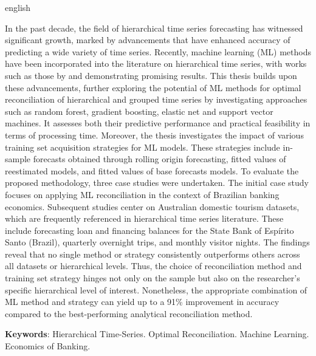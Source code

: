 \begin{resumo}[Abstract]
  \begin{otherlanguage*}{english}
    
    In the past decade, the field of hierarchical time series forecasting has witnessed significant growth, marked by advancements that have enhanced accuracy of predicting a wide variety of time series. Recently, machine learning (ML) methods have been incorporated into the literature on hierarchical time series, with works such as those by \textcite{spiliotis_hierarchical_2021} and \textcite{makridakis_m5_2022} demonstrating promising results. This thesis builds upon these advancements, further exploring the potential of ML methods for optimal reconciliation of hierarchical and grouped time series by investigating approaches such as random forest, gradient boosting, elastic net and support vector machines. It assesses both their predictive performance and practical feasibility in terms of processing time. Moreover, the thesis investigates the impact of various training set acquisition strategies for ML models. These strategies include in-sample forecasts obtained through rolling origin forecasting, fitted values of reestimated models, and fitted values of base forecasts models. To evaluate the proposed methodology, three case studies were undertaken. The initial case study focuses on applying ML reconciliation in the context of Brazilian banking economics. Subsequent studies center on Australian domestic tourism datasets, which are frequently referenced in hierarchical time series literature. These include forecasting loan and financing balances for the State Bank of Espírito Santo (Brazil), quarterly overnight trips, and monthly visitor nights. The findings reveal that no single method or strategy consistently outperforms others across all datasets or hierarchical levels. Thus, the choice of reconciliation method and training set strategy hinges not only on the sample but also on the researcher's specific hierarchical level of interest. Nonetheless, the appropriate combination of ML method and strategy can yield up to a 91\% improvement in accuracy compared to the best-performing analytical reconciliation method.
    \vspace{\onelineskip}
 
    \noindent 
    \textbf{Keywords}: Hierarchical Time-Series. Optimal Reconciliation. Machine Learning. Economics of Banking.
  \end{otherlanguage*}
\end{resumo}

